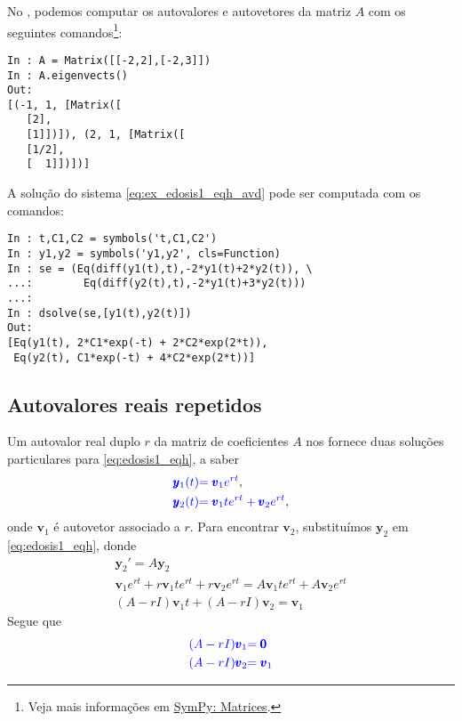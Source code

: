 \begin{ex}
\ifispython
No \python, podemos computar os autovalores e autovetores da matriz $A$ com os seguintes comandos\footnote{Veja mais informações em \href{https://docs.sympy.org/latest/tutorial/matrices.html}{SymPy: Matrices}.}:
\begin{verbatim}
In : A = Matrix([[-2,2],[-2,3]])
In : A.eigenvects()
Out: 
[(-1, 1, [Matrix([
   [2],
   [1]])]), (2, 1, [Matrix([
   [1/2],
   [  1]])])]
\end{verbatim}

A solução do sistema \eqref{eq:ex_edosis1_eqh_avd} pode ser computada com os comandos:
\begin{verbatim}
In : t,C1,C2 = symbols('t,C1,C2')
In : y1,y2 = symbols('y1,y2', cls=Function)
In : se = (Eq(diff(y1(t),t),-2*y1(t)+2*y2(t)), \
...:        Eq(diff(y2(t),t),-2*y1(t)+3*y2(t)))
...: 
In : dsolve(se,[y1(t),y2(t)])
Out: 
[Eq(y1(t), 2*C1*exp(-t) + 2*C2*exp(2*t)),
 Eq(y2(t), C1*exp(-t) + 4*C2*exp(2*t))]
\end{verbatim}
\fi
\end{ex}

\subsection{Autovalores reais repetidos}

Um autovalor real duplo $r$ da matriz de coeficientes $A$ nos fornece duas soluções particulares para \eqref{eq:edosis1_eqh}, a saber
\begin{align}
  {\color{blue}\pmb{y}_1(t)} &{\color{blue}= \pmb{v}_1e^{rt}},\\
  {\color{blue}\pmb{y}_2(t)} &{\color{blue}= \pmb{v}_1te^{rt} + \pmb{v}_2e^{rt}},
\end{align}
onde $\pmb{v}_1$ é autovetor associado a $r$. Para encontrar $\pmb{v}_2$, substituímos $\pmb{y}_2$ em \eqref{eq:edosis1_eqh}, donde
\begin{gather}
  \pmb{y}_2' = A\pmb{y}_2 \\
  \pmb{v}_1e^{rt} + r\pmb{v}_1te^{rt} + r\pmb{v}_2e^{rt} = A\pmb{v}_1te^{rt} + A\pmb{v}_2e^{rt} \\
  (A-rI)\pmb{v}_1t + (A-rI)\pmb{v}_2 = \pmb{v}_1
\end{gather}
Segue que
\begin{align}
  {\color{blue}(A-rI)\pmb{v}_1} &{\color{blue}= \pmb{0}} \\
  {\color{blue}(A-rI)\pmb{v}_2} &{\color{blue}= \pmb{v}_1}
\end{align}

